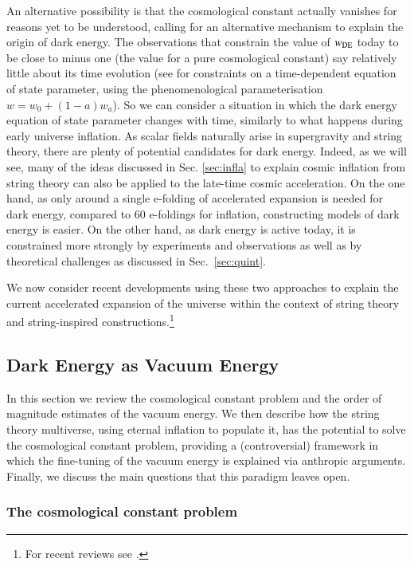 An alternative possibility is that the cosmological constant actually vanishes for reasons yet to be understood, calling for an alternative mechanism to explain the origin of dark energy.  The observations that constrain the value of $w_{\rm DE}$ today to be close to minus one (the value for a 
pure cosmological constant) say relatively little about its time evolution (see \cite{Planck:2018vyg} for constraints on a time-dependent equation of state parameter, using the phenomenological parameterisation $w = w_0 + (1-a)w_a$). So we can consider a situation in which the dark energy equation of state parameter changes with time, similarly to what happens during early universe inflation. As scalar fields naturally arise in supergravity and string theory, there are plenty of potential candidates for dark energy. Indeed, as we will see, many of the ideas discussed in Sec. \ref{sec:infla} to explain cosmic inflation from string theory can also be applied to the late-time cosmic acceleration. On the one hand, as only around a single e-folding of accelerated expansion is needed for dark energy, compared to $60$ e-foldings for inflation, constructing models of dark energy is easier. On the other hand, as dark energy is active today, it is constrained more strongly by  experiments and observations as well as by theoretical challenges as discussed in Sec.~\ref{sec:quint}.

We now consider recent developments using these two approaches to explain the current accelerated expansion of the universe within the context of string theory and string-inspired constructions.\footnote{For recent reviews see \cite{Berglund:2022qsb, Dutta:2021bih}.}

\subsection{Dark Energy as Vacuum Energy}

In this section we review the cosmological constant problem and the order of magnitude estimates of the vacuum energy.  We then describe how the string theory multiverse, using eternal inflation to populate it, has the potential to solve the cosmological constant problem, providing a (controversial) framework in which the fine-tuning of the vacuum energy is explained via anthropic arguments. Finally, we discuss the main questions that this paradigm leaves open.

\subsubsection{The cosmological constant problem}

